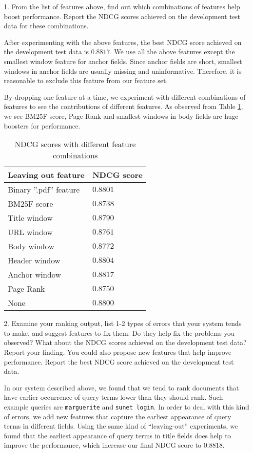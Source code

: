 1. From the list of features above, find out which combinations of features help boost
performance. Report the NDCG scores achieved on the development test data
for these combinations.

After experimenting with the above features, the best NDCG score achieved on the development test data is $0.8817$.
We use all the above features except the smallest window feature for anchor fields.
Since anchor fields are short, smallest windows in anchor fields are usually missing and uninformative.
Therefore, it is reasonable to exclude this feature from our feature set.

By dropping one feature at a time, we experiment with different combinations of features to see the contributions of different features. As observed from Table \ref{tab:perform}, we see BM25F score, Page Rank and smallest windows in body fields are huge boosters for performance.
\begin{table}
\begin{center}
\begin{tabular}{|l|l|}
  \hline
  Leaving out feature & NDCG score \\
  \hline
  Binary ''.pdf'' feature & $0.8801$ \\
  BM25F score & $0.8738$ \\
  Title window & $0.8790$ \\
  URL window & $0.8761$ \\
  Body window & $0.8772$ \\
  Header window & $0.8804$ \\
  Anchor window & $\mathbf{0.8817}$ \\
  Page Rank & $0.8750$ \\
  None & $0.8800$ \\
  \hline
\end{tabular}
\caption{NDCG scores with different feature combinations}\label{tab:perform}
\end{center}
\end{table}


2. Examine your ranking output, list 1-2 types of errors that your system tends
to make, and suggest features to fix them. Do they help fix the problems you
observed? What about the NDCG scores achieved on the development test data?
Report your finding. You could also propose new features that help improve performance.
Report the best NDCG score achieved on the development test data.

In our system described above, we found that we tend to rank documents that have earlier occurrence of query terms
lower than they should rank. Such example queries are \verb|marguerite| and \verb|sunet login|.
In order to deal with this kind of errors, we add new features that capture the earliest appearance of query terms in
different fields.
Using the same kind of ``leaving-out'' experiments, we found that the earliest appearance of query terms in title fields
does help to improve the performance, which increase our final NDCG score to $0.8818$.


